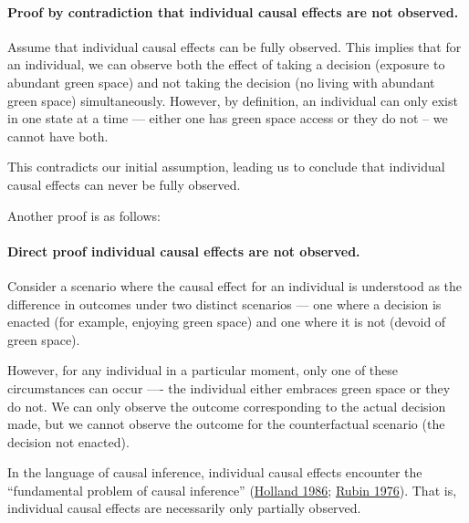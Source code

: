 \documentclass[
  singlecolumn]{article}
\let\oldparagraph\paragraph
\renewcommand{\paragraph}[1]{\oldparagraph{#1}\mbox{}}
\begin{document}
\hypertarget{proof-by-contradiction-that-individual-causal-effects-are-not-observed.}{%
\paragraph{\texorpdfstring{\textbf{Proof by contradiction that
individual causal effects are not
observed.}}{Proof by contradiction that individual causal effects are not observed.}}\label{proof-by-contradiction-that-individual-causal-effects-are-not-observed.}}

Assume that individual causal effects can be fully observed. This
implies that for an individual, we can observe both the effect of taking
a decision (exposure to abundant green space) and not taking the
decision (no living with abundant green space) simultaneously. However,
by definition, an individual can only exist in one state at a time ---
either one has green space access or they do not -- we cannot have both.

This contradicts our initial assumption, leading us to conclude that
individual causal effects can never be fully observed.

Another proof is as follows:

\hypertarget{direct-proof-individual-causal-effects-are-not-observed.}{%
\paragraph{\texorpdfstring{\textbf{Direct proof individual causal
effects are not
observed.}}{Direct proof individual causal effects are not observed.}}\label{direct-proof-individual-causal-effects-are-not-observed.}}

Consider a scenario where the causal effect for an individual is
understood as the difference in outcomes under two distinct scenarios
--- one where a decision is enacted (for example, enjoying green space)
and one where it is not (devoid of green space).

However, for any individual in a particular moment, only one of these
circumstances can occur ---- the individual either embraces green space
or they do not. We can only observe the outcome corresponding to the
actual decision made, but we cannot observe the outcome for the
counterfactual scenario (the decision not enacted).

In the language of causal inference, individual causal effects encounter
the ``fundamental problem of causal inference''
(\protect\hyperlink{ref-holland1986}{Holland 1986};
\protect\hyperlink{ref-rubin1976}{Rubin 1976}). That is, individual
causal effects are necessarily only partially observed.
\end{document}
